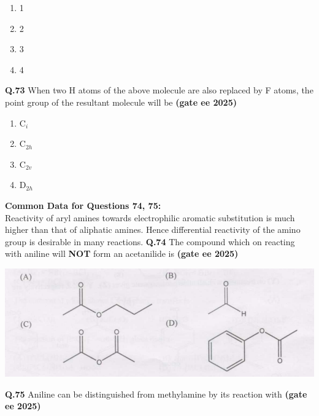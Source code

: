 \documentclass[journal,12pt,onecolumn]{exam}
\theoremstyle{remark}
\begin{document}
\begin{multicols}{2}
\begin{enumerate}[label=(\Alph*)]
\item 1
\item 2
\item 3
\item 4
\end{enumerate}
\end{multicols}
\vspace{0.5cm}

\noindent \textbf{Q.73} When two H atoms of the above molecule are also replaced by F atoms, the point group of the resultant molecule will be \hfill{\textbf{(gate ee 2025)}}

\begin{multicols}{2}
\begin{enumerate}[label=(\Alph*)]
\item C$_i$
\item C$_{2h}$
\item C$_{2v}$
\item D$_{2h}$
\end{enumerate}
\end{multicols}
\vspace{0.5 cm}

\noindent \textbf{Common Data for Questions 74, 75:} \\
Reactivity of aryl amines towards electrophilic aromatic substitution is much higher than that of aliphatic amines. Hence differential reactivity of the amino group is desirable in many reactions.
\vspace{1cm}
\noindent \textbf{Q.74} The compound which on reacting with aniline will \textbf{NOT} form an acetanilide is \hfill{\textbf{(gate ee 2025)}}

\includegraphics[scale=1]{images/image13.png}
\vspace{1cm}

\noindent \textbf{Q.75} Aniline can be distinguished from methylamine by its reaction with \hfill{\textbf{(gate ee 2025)}}
\end{document}
